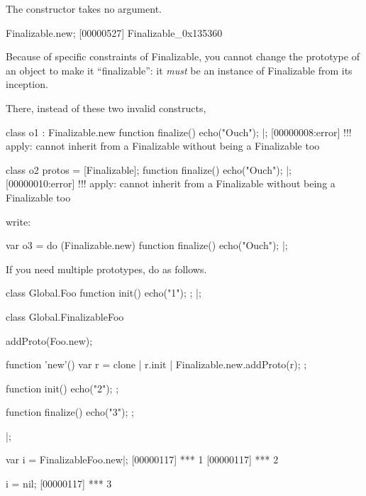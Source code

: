The constructor takes no argument.

\begin{urbiscript}
Finalizable.new;
[00000527] Finalizable_0x135360
\end{urbiscript}

\bigskip

Because of specific constraints of Finalizable, you cannot change the
prototype of an object to make it ``finalizable'': it \emph{must} be an
instance of Finalizable from its inception.

There, instead of these two invalid constructs,

\begin{multicols}{2}
\begin{urbiscript}
class o1 : Finalizable.new
{
  function finalize()
  {
    echo("Ouch");
  }
}|;
[00000008:error] !!! apply: cannot inherit from a Finalizable without being a Finalizable too
\end{urbiscript}

\begin{urbiscript}
class o2
{
  protos = [Finalizable];
  function finalize()
  {
    echo("Ouch");
  }
}|;
[00000010:error] !!! apply: cannot inherit from a Finalizable without being a Finalizable too
\end{urbiscript}
\end{multicols}

write:

\begin{urbiscript}
var o3 =
  do (Finalizable.new)
  {
    function finalize()
    {
      echo("Ouch");
    }
  }|;
\end{urbiscript}

\bigskip

If you need multiple prototypes, do as follows.

\begin{urbiscript}
class Global.Foo
{
  function init()
  {
    echo("1");
  };
}|;

class Global.FinalizableFoo
{
  addProto(Foo.new);

  function 'new'()
  {
    var r = clone |
    r.init |
    Finalizable.new.addProto(r);
  };

  function init()
  {
    echo("2");
  };

  function finalize()
  {
    echo("3");
  };

}|;

var i = FinalizableFoo.new|;
[00000117] *** 1
[00000117] *** 2

i = nil;
[00000117] *** 3
\end{urbiscript}



